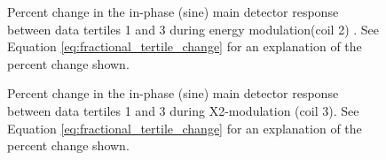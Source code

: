 \begin{figure}[h]

\centering
{}
\caption{Percent change in the in-phase (sine) main detector response between data tertiles 1 and 3 during energy modulation(coil 2) . See Equation \ref{eq:fractional_tertile_change} for an explanation of the percent change shown.}
\label{fig:tert_md_coeff_coil2}
\end{figure}
\begin{figure}[h]

\centering
{}
\caption{Percent change in the in-phase (sine) main detector response between data tertiles 1 and 3 during X2-modulation (coil 3). See Equation \ref{eq:fractional_tertile_change} for an explanation of the percent change shown.}
\label{fig:tert_md_coeff_coil3}
\end{figure}

